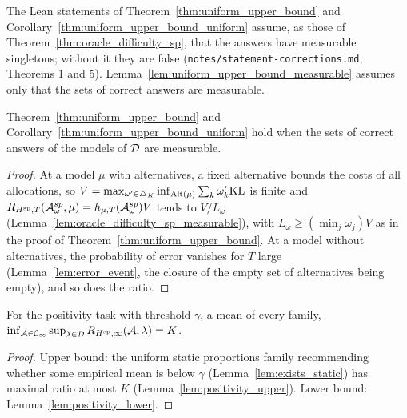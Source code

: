 The Lean statements of Theorem~\ref{thm:uniform_upper_bound} and
Corollary~\ref{thm:uniform_upper_bound_uniform} assume, as those of
Theorem~\ref{thm:oracle_difficulty_sp}, that the answers have measurable singletons; without it they
are false (\texttt{notes/statement-corrections.md}, Theorems 1 and 5).
Lemma~\ref{lem:uniform_upper_bound_measurable} assumes only that the sets of correct answers are
measurable.

\begin{lemma}[{\cite[Theorem 5]{D23}}]
  \label{lem:uniform_upper_bound_measurable}
  \leanok
  Theorem~\ref{thm:uniform_upper_bound} and Corollary~\ref{thm:uniform_upper_bound_uniform} hold
  when the sets of correct answers of the models of $\mathcal{D}$ are measurable.
\end{lemma}

\begin{proof}
  \leanok
  At a model $\mu$ with alternatives, a fixed alternative bounds the costs of all allocations, so
  $V = \max_{\omega' \in \triangle_K} \inf_{\mathrm{Alt}(\mu)} \sum_k \omega'_k \mathrm{KL}$ is finite and
  $R_{H^{\mathrm{sp}}, T}(\mathcal{A}^{sp}_{\omega}, \mu) = h_{\mu, T}(\mathcal{A}^{sp}_{\omega}) V$ tends to $V / L_{\omega}$
  (Lemma~\ref{lem:oracle_difficulty_sp_measurable}), with $L_{\omega} \ge (\min_j \omega_j) V$ as in
  the proof of Theorem~\ref{thm:uniform_upper_bound}. At a model without alternatives, the
  probability of error vanishes for $T$ large (Lemma~\ref{lem:error_event}, the closure of the empty
  set of alternatives being empty), and so does the ratio.
\end{proof}

\begin{theorem}[{\cite[Theorem 6]{D23}}]
  \label{thm:positivity_LB}
  \leanok
  For the positivity task with threshold $\gamma$, a mean of every family,
  $\inf_{\mathcal{A} \in \mathcal{C}_{\infty}} \sup_{\lambda \in \mathcal{D}} R_{H^{\mathrm{sp}}, \infty}(\mathcal{A}, \lambda) = K$.
\end{theorem}

\begin{proof}
  \leanok
  Upper bound: the uniform static proportions family recommending whether some empirical mean is
  below $\gamma$ (Lemma~\ref{lem:exists_static}) has maximal ratio at most $K$
  (Lemma~\ref{lem:positivity_upper}). Lower bound: Lemma~\ref{lem:positivity_lower}.
\end{proof}

